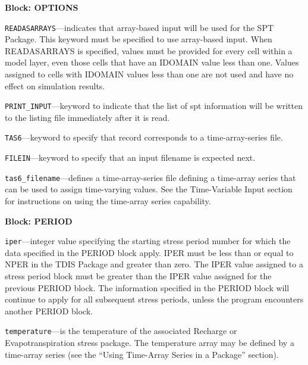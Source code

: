 
\item \textbf{Block: OPTIONS}

\begin{description}
\item \texttt{READASARRAYS}---indicates that array-based input will be used for the SPT Package.  This keyword must be specified to use array-based input.  When READASARRAYS is specified, values must be provided for every cell within a model layer, even those cells that have an IDOMAIN value less than one.  Values assigned to cells with IDOMAIN values less than one are not used and have no effect on simulation results.

\item \texttt{PRINT\_INPUT}---keyword to indicate that the list of spt information will be written to the listing file immediately after it is read.

\item \texttt{TAS6}---keyword to specify that record corresponds to a time-array-series file.

\item \texttt{FILEIN}---keyword to specify that an input filename is expected next.

\item \texttt{tas6\_filename}---defines a time-array-series file defining a time-array series that can be used to assign time-varying values. See the Time-Variable Input section for instructions on using the time-array series capability.

\end{description}
\item \textbf{Block: PERIOD}

\begin{description}
\item \texttt{iper}---integer value specifying the starting stress period number for which the data specified in the PERIOD block apply.  IPER must be less than or equal to NPER in the TDIS Package and greater than zero.  The IPER value assigned to a stress period block must be greater than the IPER value assigned for the previous PERIOD block.  The information specified in the PERIOD block will continue to apply for all subsequent stress periods, unless the program encounters another PERIOD block.

\item \texttt{temperature}---is the temperature of the associated Recharge or Evapotranspiration stress package.  The temperature array may be defined by a time-array series (see the ``Using Time-Array Series in a Package'' section).

\end{description}

